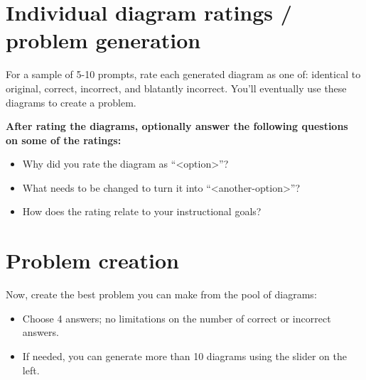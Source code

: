 \section*{Individual diagram ratings / problem generation}
For a sample of 5-10 prompts, rate each generated diagram as one of: identical to original, correct, incorrect, and blatantly incorrect. You'll eventually use these diagrams to create a problem.

\textbf{After rating the diagrams, optionally answer the following questions on some of the ratings:}
\begin{itemize}
    \item Why did you rate the diagram as ``<option>''?
    \item What needs to be changed to turn it into ``<another-option>''?
    \item How does the rating relate to your instructional goals?
\end{itemize}

\section*{Problem creation}
Now, create the best problem you can make from the pool of diagrams:
\begin{itemize}
    \item Choose 4 answers; no limitations on the number of correct or incorrect answers.
    \item If needed, you can generate more than 10 diagrams using the slider on the left.
\end{itemize}

